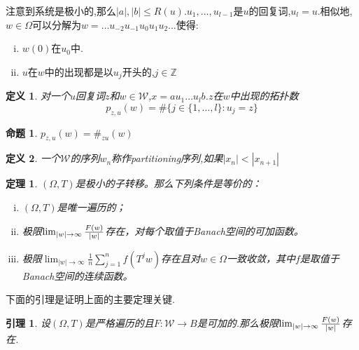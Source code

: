 \documentclass[a4paper,11pt,oneside]{book}
\newtheorem{theorem}{\textbf{\hspace{0.7cm}定理}}[section]
\newtheorem{lemma}{\textbf{\hspace{0.7cm}引理}}[section]
\newtheorem{definition}{\textbf{\hspace{0.7cm}定义}}[section]
\newtheorem{proposition}{\textbf{\hspace{0.7cm}命题}}[section]
\begin{document}
注意到系统是极小的,那么$|a|,|b|\leq R(u)$.$u_1,\ldots,u_{l-1}$是$u$的回复词,$u_l=u$.相似地,$w\in\Omega$可以分解为$w=\ldots u_{-2}u_{-1}u_0u_1u_2\ldots$使得:
\begin{enumerate}[(i)]
\item $w(0)$在$u_0$中.
\item $u$在$w$中的出现都是以$u_j$开头的,$j\in \mathbb{Z}$
\end{enumerate}

\begin{definition}
对一个$u$回复词$z$和$w\in\mathcal{W}$,$x=au_1\ldots u_lb$.$z$在$w$中出现的拓扑数
$$p_{z,u}(w)=\#\{j\in\{1,\ldots,l\}:u_j=z\}$$
\end{definition}

\begin{proposition}
$p_{z,u}(w)=\#_{zu}(w)$
\end{proposition}

\begin{definition}
一个$\mathcal{W}$的序列${w_n}$称作partitioning序列,如果$|x_n|<|x_{n+1}|$
\end{definition}
\begin{theorem}
$(\Omega,T)$是极小的子转移。那么下列条件是等价的：
\begin{enumerate}[(i)]
\item $(\Omega,T)$是唯一遍历的；
\item 极限$\lim_{|w|\to \infty}{F(w)\over |w|}$存在，对每个取值于Banach空间的可加函数。
\item 极限$\lim_{|w|\to \infty}\frac{1}{n}\sum_{j=1}^n{f(T^jw)}$存在且对$w\in \Omega$一致收敛，其中$f$是取值于Banach空间的连续函数。
\end{enumerate}
\end{theorem}

下面的引理是证明上面的主要定理关键.

\begin{lemma}
\label{l:2}
设$(\Omega,T)$是严格遍历的且$F:\mathcal{W}\rightarrow B$是可加的.那么极限$\lim_{|w|\to \infty}{F(w)\over |w|}$存在.
\end{lemma}
\end{document}
